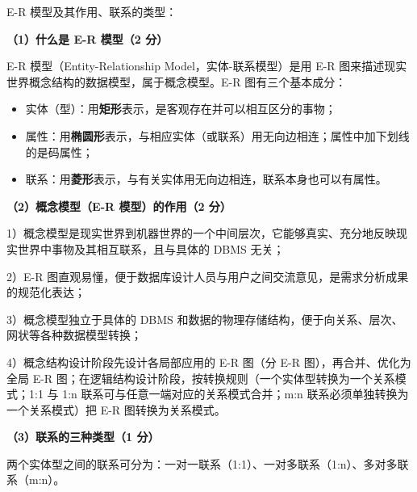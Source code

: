 \documentclass[a4paper,11pt]{article}
\begin{document}
\q E-R 模型及其作用、联系的类型：
\begin{analysis}
\textbf{（1）什么是 E-R 模型（2 分）}

E-R 模型（Entity-Relationship Model，实体-联系模型）是用 E-R 图来描述现实世界概念结构的数据模型，属于概念模型。E-R 图有三个基本成分：
\begin{itemize}[leftmargin=1.6em, itemsep=1pt]
  \item 实体（型）：用\textbf{矩形}表示，是客观存在并可以相互区分的事物；
  \item 属性：用\textbf{椭圆形}表示，与相应实体（或联系）用无向边相连；属性中加下划线的是码属性；
  \item 联系：用\textbf{菱形}表示，与有关实体用无向边相连，联系本身也可以有属性。
\end{itemize}

\textbf{（2）概念模型（E-R 模型）的作用（2 分）}

1）概念模型是现实世界到机器世界的一个中间层次，它能够真实、充分地反映现实世界中事物及其相互联系，且与具体的 DBMS 无关；

2）E-R 图直观易懂，便于数据库设计人员与用户之间交流意见，是需求分析成果的规范化表达；

3）概念模型独立于具体的 DBMS 和数据的物理存储结构，便于向关系、层次、网状等各种数据模型转换；

4）概念结构设计阶段先设计各局部应用的 E-R 图（分 E-R 图），再合并、优化为全局 E-R 图；在逻辑结构设计阶段，按转换规则（一个实体型转换为一个关系模式；1:1 与 1:n 联系可与任意一端对应的关系模式合并；m:n 联系必须单独转换为一个关系模式）把 E-R 图转换为关系模式。

\textbf{（3）联系的三种类型（1 分）}

两个实体型之间的联系可分为：一对一联系（1:1）、一对多联系（1:n）、多对多联系（m:n）。
\end{analysis}
\end{document}
